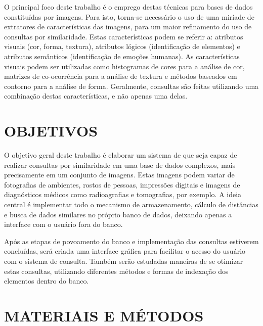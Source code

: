 O principal foco deste trabalho é o emprego destas técnicas para bases de dados constituídas por imagens. Para isto, torna-se necessário o uso de uma miríade de extratores de características
das imagens, para um maior refinamento do uso de consultas por similaridade. Estas características podem se referir a: atributos visuais (cor, forma, textura), atributos lógicos (identificação
de elementos) e atributos semânticos (identificação de emoções humanas). As características visuais podem ser utilizadas como histogramas de cores para a análise de cor, matrizes de co-ocorrência para a análise de textura e
métodos baseados em contorno para a análise de forma. Geralmente, consultas são feitas utilizando uma combinação destas características, e não apenas uma delas.
\\

{\let\clearpage\relax \chapter{OBJETIVOS}}
\label{chap:objetivos}
O objetivo geral deste trabalho é elaborar um sistema de que seja capaz de realizar consultas por similaridade em uma base de dados complexos, mais precisamente em um conjunto de imagens.
Estas imagens podem variar de fotografias de ambientes, rostos de pessoas, impressões digitais e imagens de diagnósticos médicos como radioagrafias e tomografias, por exemplo.
A ideia central é implementar todo o mecanismo de armazenamento, cálculo de distâncias e busca de dados similares no próprio banco de dados, deixando apenas a interface com o usuário fora do banco.

Após as etapas de povoamento do banco e implementação das consultas estiverem concluídas, será criada uma interface gráfica para facilitar o acesso do usuário com o sistema de consulta. Também serão
estudadas maneiras de se otimizar estas consultas, utilizando diferentes métodos e formas de indexação dos elementos dentro do banco. \\



{\let\clearpage\relax \chapter{MATERIAIS E MÉTODOS}}
\label{chap:matmetodos}

